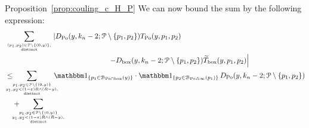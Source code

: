 \begin{proofof}{Proposition~\ref{prop:couling_c_H_P}}
We can now bound the sum by the following expression:
\begin{align} 
	&\sum_{(p_1,p_2) \in \Pcal \setminus \{(0,y)\}, \atop \text{distinct}}
	  \left| D_{\Po}(y,k_n-2; \Pcal \setminus \{p_1,p_2 \}) T_{\Po} (y,p_1,p_2) \right. \notag \\
	& \hspace{5cm} \left. - D_{\text{box}} (y,k_n-2;\Pcal \setminus \{p_1,p_2\}) \widetilde{T}_{\text{box}} (y,p_1,p_2)
	   \right|  \notag \\
	&\le \hspace{-15pt} \sum_{{p_1,p_2\in \Pcal \setminus \{(0,y)\} \atop  y_1, y_2 < (1-\eps)R \wedge (R-y),} \atop \text{distinct}}
		\hspace{-10pt} \ind{p_1 \in \BallInter{y}} \cdot \ind{p_2 \in \BallSym{p_1}} 
		\, D_{\Po} (y,k_n-2;\Pcal \setminus \{ p_1,p_2\}) \label{eq:sum_1}\\
	&\hspace{10pt}+ \hspace{-15pt} \sum_{{p_1,p_2\in \Pcal \setminus \{(0,y)\} \atop  y_1, y_2 < (1-\eps)R \wedge (R-y),} \atop \text{distinct}}

\end{align}
\end{proofof}
